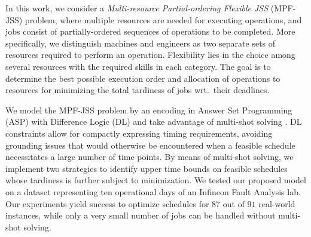 \documentclass[submission,copyright,creativecommons]{eptcs}
\begin{document}
In this work, we consider a \emph{Multi-resource Partial-ordering Flexible JSS} (MPF-JSS) problem, where multiple resources are needed for executing operations, and jobs consist of partially-ordered sequences of operations to be completed.
More specifically, we distinguish machines and engineers as two separate sets of resources
required to perform an operation.
Flexibility lies in the choice among several resources with the required skills in each category.
The goal is to determine the best possible execution order and allocation of operations to resources %
for minimizing the total tardiness of jobs wrt.\ their deadlines. 

We model the MPF-JSS problem by an encoding in Answer Set Programming (ASP) with Difference Logic (DL) \cite{gebser2016theory} and take advantage of multi-shot solving \cite{gebser2019multi}.
DL constraints allow for compactly expressing timing requirements, avoiding grounding issues that would otherwise be encountered when a feasible schedule necessitates a large number of time points.
By means of multi-shot solving, we implement two strategies to identify upper time bounds on feasible schedules whose tardiness is further subject to minimization.
We tested our proposed model on a dataset representing ten operational days of an Infineon Fault Analysis lab.
Our experiments yield success to optimize schedules for $87$ out of $91$ real-world instances,
while only a very small number of jobs can be handled without multi-shot solving.
\end{document}
